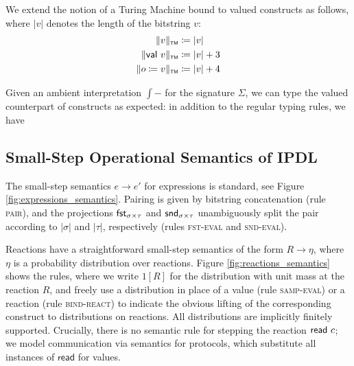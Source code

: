 \noindent We extend the notion of a Turing Machine bound to valued \ipdl constructs as follows, where $|v|$ denotes the length of the bitstring $v$:
\begin{align*}
\Vert v \Vert_{\scriptscriptstyle \mathsf{TM}} & \coloneqq |v| \\
\Vert \mathsf{val} \ v \Vert_{\scriptscriptstyle \mathsf{TM}} & \coloneqq |v| + 3 \\
\Vert o \coloneqq v \Vert_{\scriptscriptstyle \mathsf{TM}} & \coloneqq |v| + 4
\end{align*}

\noindent Given an ambient interpretation $\int{-}$ for the signature $\Sigma$, we can type the valued counterpart of \ipdl constructs as expected: in addition to the regular typing rules, we have


\subsection{Small-Step Operational Semantics of IPDL}

The small-step semantics $e \to e'$ for expressions is standard, see Figure \ref{fig:expressions_semantics}. Pairing is given by bitstring concatenation (rule \textsc{pair}), and the projections $\mathsf{fst}_{\sigma \times \tau}$ and $\mathsf{snd}_{\sigma \times \tau}$ unambiguously split the pair according to $|\sigma|$ and $|\tau|$, respectively (rules \textsc{fst-eval} and \textsc{snd-eval}).

Reactions have a straightforward small-step semantics of the form $R \to \eta$, where $\eta$ is a probability distribution over reactions. Figure \ref{fig:reactions_semantics} shows the rules, where we write $1[R]$ for the distribution with unit mass at the reaction $R$, and freely use a distribution in place of a value (rule \textsc{samp-eval}) or a reaction (rule \textsc{bind-react}) to indicate the obvious lifting of the corresponding construct to distributions on reactions. All distributions are implicitly finitely supported. Crucially, there is no semantic rule for stepping the reaction $\mathsf{read} \ c$; we model communication via semantics for protocols, which substitute all instances of $\mathsf{read}$ for values.

